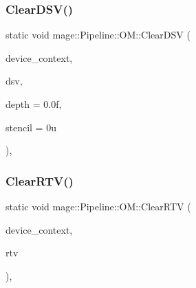 \hypertarget{structmage_1_1_pipeline_1_1_o_m_a17b8f27631e5513b31b7294b93a0823a}{}\label{structmage_1_1_pipeline_1_1_o_m_a17b8f27631e5513b31b7294b93a0823a} 
\subsubsection{\texorpdfstring{Clear\+D\+S\+V()}{ClearDSV()}}
{\footnotesize\ttfamily static void mage\+::\+Pipeline\+::\+O\+M\+::\+Clear\+D\+SV (\begin{DoxyParamCaption}\item[{I\+D3\+D11\+Device\+Context4 $\ast$}]{device\+\_\+context,  }\item[{I\+D3\+D11\+Depth\+Stencil\+View $\ast$}]{dsv,  }\item[{\hyperlink{namespacemage_aa97e833b45f06d60a0a9c4fc22ae02c0}{F32}}]{depth = {\ttfamily 0.0f},  }\item[{\hyperlink{namespacemage_afc638980bc6154f15af5e2d93a0e0ea9}{U8}}]{stencil = {\ttfamily 0u} }\end{DoxyParamCaption})\hspace{0.3cm}{\ttfamily [static]}, {\ttfamily [noexcept]}}

\hypertarget{structmage_1_1_pipeline_1_1_o_m_aa2383d1a29a34cacbc9fd96f97af31f7}{}\label{structmage_1_1_pipeline_1_1_o_m_aa2383d1a29a34cacbc9fd96f97af31f7} 
\subsubsection{\texorpdfstring{Clear\+R\+T\+V()}{ClearRTV()}\hspace{0.1cm}{\footnotesize\ttfamily [1/2]}}
{\footnotesize\ttfamily static void mage\+::\+Pipeline\+::\+O\+M\+::\+Clear\+R\+TV (\begin{DoxyParamCaption}\item[{I\+D3\+D11\+Device\+Context4 $\ast$}]{device\+\_\+context,  }\item[{I\+D3\+D11\+Render\+Target\+View $\ast$}]{rtv }\end{DoxyParamCaption})\hspace{0.3cm}{\ttfamily [static]}, {\ttfamily [noexcept]}}

\hypertarget{structmage_1_1_pipeline_1_1_o_m_af93a2f44917e3637fcbc471bfe58b401}{}\label{structmage_1_1_pipeline_1_1_o_m_af93a2f44917e3637fcbc471bfe58b401} 

